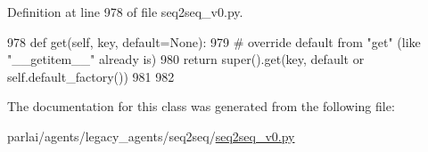 Definition at line 978 of file seq2seq\+\_\+v0.\+py.


\begin{DoxyCode}
978     \textcolor{keyword}{def }get(self, key, default=None):
979         \textcolor{comment}{# override default from "get" (like "\_\_getitem\_\_" already is)}
980         \textcolor{keywordflow}{return} super().get(key, default \textcolor{keywordflow}{or} self.default\_factory())
981 
982 
\end{DoxyCode}


The documentation for this class was generated from the following file\+:\begin{DoxyCompactItemize}
\item 
parlai/agents/legacy\+\_\+agents/seq2seq/\hyperlink{seq2seq__v0_8py}{seq2seq\+\_\+v0.\+py}\end{DoxyCompactItemize}
